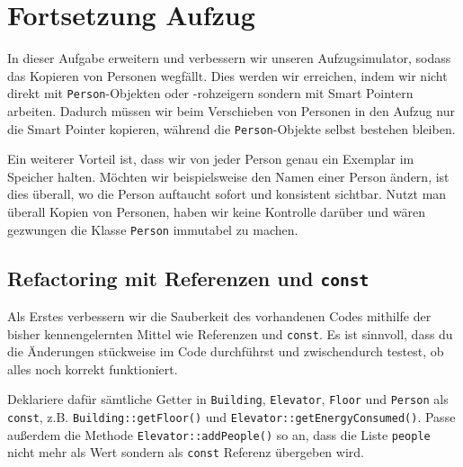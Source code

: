 \section{Fortsetzung Aufzug}
In dieser Aufgabe erweitern und verbessern wir unseren Aufzugsimulator, sodass das Kopieren von Personen wegfällt.
Dies werden wir erreichen, indem wir nicht direkt mit \texttt{Person}-Objekten oder -rohzeigern sondern mit Smart Pointern arbeiten.
Dadurch müssen wir beim Verschieben von Personen in den Aufzug nur die Smart Pointer kopieren, während die \texttt{Person}-Objekte selbst bestehen bleiben.

Ein weiterer Vorteil ist, dass wir von jeder Person genau ein Exemplar im Speicher halten.
Möchten wir beispielsweise den Namen einer Person ändern, ist dies überall, wo die Person auftaucht sofort und konsistent sichtbar.
Nutzt man überall Kopien von Personen, haben wir keine Kontrolle darüber und wären gezwungen die Klasse \texttt{Person} immutabel zu machen.


\subsection{Refactoring mit Referenzen und \texttt{const}}
Als Erstes verbessern wir die Sauberkeit des vorhandenen Codes mithilfe der bisher kennengelernten Mittel wie Referenzen und \texttt{const}.
Es ist sinnvoll, dass du die Änderungen stückweise im Code durchführst und zwischendurch testest, ob alles noch korrekt funktioniert.

Deklariere dafür sämtliche Getter in \texttt{Building}, \texttt{Elevator}, \texttt{Floor} und \texttt{Person} als \texttt{const}, z.B. \texttt{Building::getFloor()} und \texttt{Elevator::getEnergyConsumed()}.
Passe außerdem die Methode \texttt{Elevator::addPeople()} so an, dass die Liste \texttt{people} nicht mehr als Wert sondern als \texttt{const} Referenz übergeben wird.


